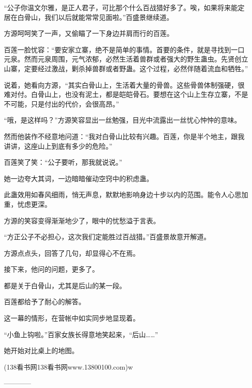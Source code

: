 \begin{this_body}
“公子你温文尔雅，是正人君子，可比那个什么百战猎好多了。唉，如果将来能定居在白骨山，我们以后就能常常见面啦。”百盛景继续道。

方源呵呵笑了一声，又偷瞄了一下身边并肩而行的百莲。

百莲一脸忧容：“要安家立寨，绝不是简单的事情。首要的条件，就是寻找到一口元泉。然而元泉周围，元气浓郁，必然生活着兽群或者强大的野生蛊虫。先贤创立山寨，定要经过激战，剿杀掉兽群或者野蛊。这个过程，必然伴随着流血和牺牲。”

说着，她看向方源，“其实白骨山上，生活着大量的骨兽。这些骨兽体制强硬，很难对付。白骨山上，也没有泥土，都是皑皑骨石。要想在这个山上生存立寨，不是不可能，只是付出的代价，会很高昂。”

“哦，是这样吗？”方源笑容显出一丝勉强，目光中流露出一丝忧心忡忡的意味。

然而他装作不经意地问道：“我对白骨山比较有兴趣。百莲，你是半个地主，跟我讲讲，这座山上到底有多少的危险。”

百莲笑了笑：“公子要听，那我就说说。”

她一边夸大其词，一边暗暗催动空窍中的积虑蛊。

此蛊效用如春风细雨，悄无声息，默默地影响身边十步以内的范围。能令人心思加重，忧虑更深。

方源的笑容变得渐渐地少了，眼中的忧愁溢于言表。

“方正公子不必担心，这次我们定能胜过百战猎。”百盛景故意开解道。

方源点点头，回答了几句，却显得心不在焉。

接下来，他问的问题，更多了。

都是关于白骨山，尤其是后山的某一段。

百莲都给予了耐心的解答。

这一幕的情形，在营帐中如实同步地显现着。

“小鱼上钩啦。”百家女族长得意地笑起来，“后山……”

她开始对比桌上的地图。

(138看书网138看书网www.13800100.com)w

------------

\end{this_body}

